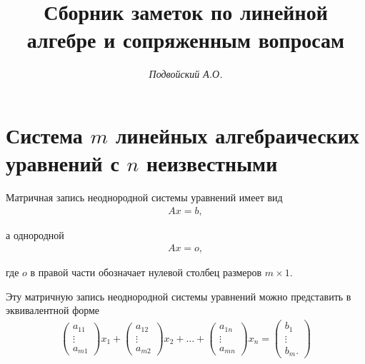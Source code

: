 \documentclass[%
	11pt,
	a4paper,
	utf8,
		]{article}
\begin{document}
\title{Сборник заметок по линейной алгебре и сопряженным вопросам}

\author{\itshape Подвойский А.О.}

\date{}
\maketitle

\thispagestyle{fancy}




\tableofcontents

\section{Система $ m $ линейных алгебраических уравнений с $ n $ неизвестными}

Матричная запись неоднородной системы уравнений имеет вид
\vspace*{-3mm}
\begin{align*}
	A x = b,
\end{align*}

\vspace*{-3mm}
а однородной
\vspace*{-3mm}
\begin{align*}
	A x = o,
\end{align*}

\vspace*{-3mm}
где $ o $ в правой части обозначает нулевой столбец размеров $ m \times 1 $.

Эту матричную запись неоднородной системы уравнений можно представить в эквивалентной форме
\begin{align*}
	\begin{pmatrix}
		a_{11} \\
		\vdots \\
		a_{m1}
	\end{pmatrix} x_1 + 
    \begin{pmatrix}
    	a_{12} \\
    	\vdots \\
    	a_{m2}
    \end{pmatrix} x_2 + \ldots +
    \begin{pmatrix}
    	a_{1n} \\
    	\vdots \\
    	a_{mn}
    \end{pmatrix} x_n = 
    \begin{pmatrix}
    	b_1 \\
    	\vdots \\
    	b_m.
    \end{pmatrix}
\end{align*}
\end{document}
